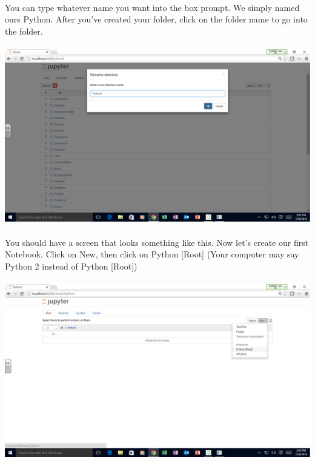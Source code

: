 \documentclass[]{article}
\begin{document}
\paragraph{}
You can type whatever name you want into the box prompt. We simply named ours Python. After you've created your folder, click on the folder name to go into the folder.
\paragraph{}
\begin{centering}
    \centerline{\includegraphics[scale=0.35]{Screenshot_19.png}}
\end{centering}

\paragraph{}
You should have a screen that looks something like this. Now let's create our first Notebook. Click on New, then click on Python [Root] (Your computer may say Python 2 instead of Python [Root])
\paragraph{}
\begin{centering}
    \centerline{\includegraphics[scale=0.35]{Screenshot_20.png}}
\end{centering}
\end{document}
